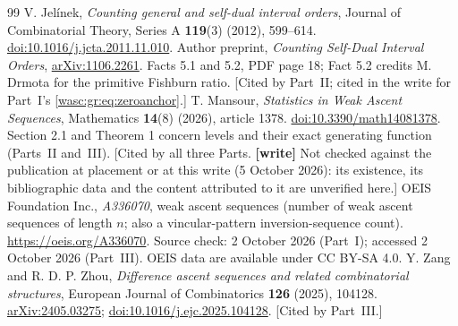 \documentclass[11pt,a4paper]{article}
\theoremstyle{remark}\newtheorem{remark}[theorem]{Remark}
\numberwithin{equation}{section}
\begin{document}
\begin{thebibliography}{99}
 V. Jel\'inek, \emph{Counting general and self-dual interval orders}, Journal of Combinatorial Theory, Series A \textbf{119}(3) (2012), 599--614. \href{https://doi.org/10.1016/j.jcta.2011.11.010}{doi:10.1016/j.jcta.2011.11.010}. Author preprint, \emph{Counting Self-Dual Interval Orders}, \href{https://arxiv.org/abs/1106.2261}{arXiv:1106.2261}. Facts 5.1 and 5.2, PDF page 18; Fact 5.2 credits M. Drmota for the primitive Fishburn ratio. [Cited by Part~II; cited in the write for Part~I's \eqref{wasc:gr:eq:zeroanchor}.]
 T. Mansour, \emph{Statistics in Weak Ascent Sequences}, Mathematics \textbf{14}(8) (2026), article 1378. \href{https://doi.org/10.3390/math14081378}{doi:10.3390/math14081378}. Section 2.1 and Theorem 1 concern levels and their exact generating function (Parts~II and~III). [Cited by all three Parts. \textbf{[write]} Not checked against the publication at placement or at this write (5 October 2026): its existence, its bibliographic data and the content attributed to it are unverified here.]
 OEIS Foundation Inc., \emph{A336070}, weak ascent sequences (number of weak ascent sequences of length $n$; also a vincular-pattern inversion-sequence count). \url{https://oeis.org/A336070}. Source check: 2 October 2026 (Part~I); accessed 2 October 2026 (Part~III). OEIS data are available under CC BY-SA 4.0.
 Y. Zang and R. D. P. Zhou, \emph{Difference ascent sequences and related combinatorial structures}, European Journal of Combinatorics \textbf{126} (2025), 104128. \href{https://arxiv.org/abs/2405.03275}{arXiv:2405.03275}; \href{https://doi.org/10.1016/j.ejc.2025.104128}{doi:10.1016/j.ejc.2025.104128}. [Cited by Part~III.]
\end{thebibliography}
\endgroup
\end{document}
